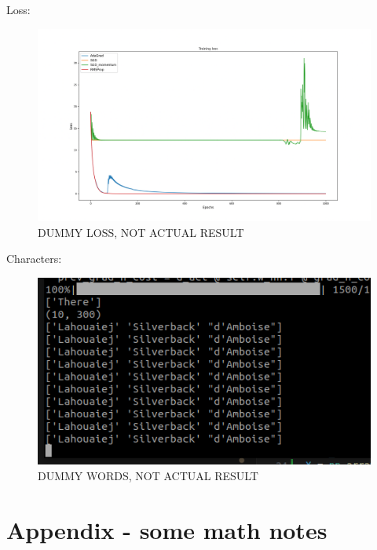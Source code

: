 \documentclass[12pt]{article}
\begin{document}
Loss:
\begin{figure}
    \centering
    \includegraphics[width = \textwidth]{texfiles/images/dummy_loss.png}
    \caption{DUMMY LOSS, NOT ACTUAL RESULT}
    \label{fig:enter-label}
\end{figure}

Characters:
\begin{figure}
    \centering
    \includegraphics[width = \textwidth]{texfiles/images/dummy_words.png}
    \caption{DUMMY WORDS, NOT ACTUAL RESULT}
    \label{fig:enter-label}
\end{figure}

\section*{Appendix - some math notes}



\printbibliography
\end{document}
